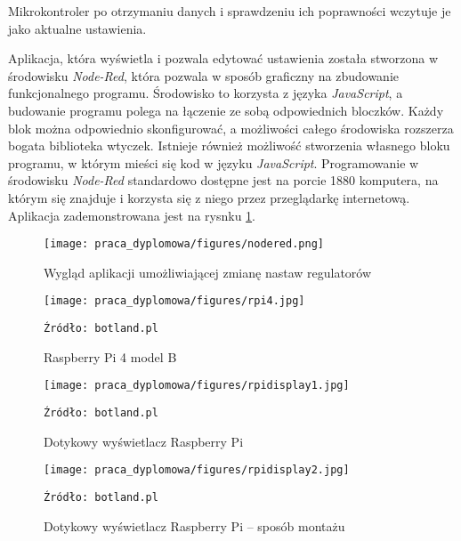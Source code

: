 Mikrokontroler po otrzymaniu danych i sprawdzeniu ich poprawności wczytuje je jako aktualne ustawienia. 

Aplikacja, która wyświetla i pozwala edytować ustawienia została stworzona w środowisku \textit{Node-Red}, która pozwala w sposób graficzny na zbudowanie funkcjonalnego programu. Środowisko to korzysta z języka \textit{JavaScript}, a budowanie programu polega na łączenie ze sobą odpowiednich bloczków. Każdy blok można odpowiednio skonfigurować, a możliwości całego środowiska rozszerza bogata biblioteka wtyczek. Istnieje również możliwość stworzenia własnego bloku programu, w którym mieści się kod w języku \textit{JavaScript}. Programowanie w środowisku \textit{Node-Red} standardowo dostępne jest na porcie 1880 komputera, na którym się znajduje i korzysta się z niego przez przeglądarkę internetową. Aplikacja zademonstrowana jest na rysnku \ref{fig:nodered}.

\begin{figure}
    \centering
    \texttt{[image: praca\_dyplomowa/figures/nodered.png]}
    \caption{Wygląd aplikacji umożliwiającej zmianę nastaw regulatorów}
    \label{fig:nodered}
\end{figure}

\begin{figure}
    \centering
    \texttt{[image: praca\_dyplomowa/figures/rpi4.jpg]}
    \caption{Raspberry Pi 4 model B}
    \texttt{Źródło: botland.pl}
    \label{fig:rpi4}
\end{figure}

\begin{figure}
    \centering
    \texttt{[image: praca\_dyplomowa/figures/rpidisplay1.jpg]}
    \caption{Dotykowy wyświetlacz Raspberry Pi}
    \texttt{Źródło: botland.pl}
    \label{fig:rpidisp1}
\end{figure}

\begin{figure}
    \centering
    \texttt{[image: praca\_dyplomowa/figures/rpidisplay2.jpg]}
    \caption{Dotykowy wyświetlacz Raspberry Pi -- sposób montażu}
    \texttt{Źródło: botland.pl}
    \label{fig:rpidisp2}
\end{figure}